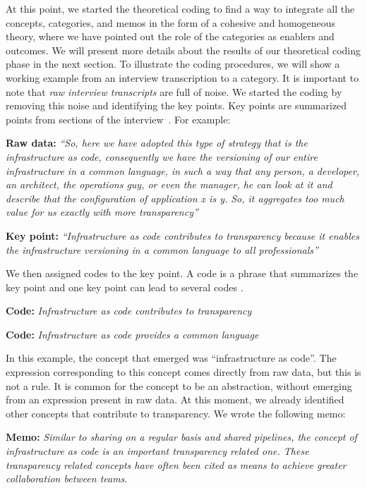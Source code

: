 At this point, we started the theoretical coding to find a way to integrate
all the concepts, categories, and memos in the form of a cohesive and
homogeneous theory, where we have pointed out the role of the categories as
enablers and outcomes. We will present more details about
the results of our theoretical coding phase in the next section.
To illustrate the coding procedures, we will show a working example from an
interview transcription to a category.
It is important to note that \emph{raw interview transcripts} are full of noise.
We started the coding by removing this noise and identifying the key points.
Key points are summarized points from sections of the interview~\cite{georgieva2008best}.
For example:

\textbf{Raw data:} \textit{``So, here we have adopted this type of strategy that is
the infrastructure as code, consequently we have the versioning of our entire
infrastructure in a common language, in such a way that any person, a
developer, an architect, the operations guy, or even the manager, he can look
at it and describe that the configuration of application x is y. So, it
aggregates too much value for us exactly with more transparency''}

\textbf{Key point:} \textit{``Infrastructure as code contributes to
transparency because it enables the infrastructure versioning in a common
language to all professionals''}

We then assigned codes to the key point. A code is a phrase that summarizes
the key point and one key point can lead to several codes \cite{hoda2017becoming}.

\textbf{Code:} \textit{Infrastructure as code contributes to transparency}

\textbf{Code:} \textit{Infrastructure as code provides a common language}

In this example, the concept that emerged was ``infrastructure as code''. The
expression corresponding to this concept comes directly from raw data, but this
is not a rule. It is common for the concept to be an abstraction, without
emerging from an expression present in raw data.
At this moment, we already identified other concepts that
contribute to transparency. We wrote the following memo:

\textbf{Memo:} \textit{Similar to sharing on a regular basis and shared
pipelines, the concept of infrastructure as code is an important transparency
related one. These transparency related concepts have often been cited as
means to achieve greater collaboration between teams}.


